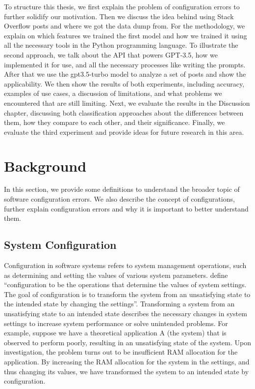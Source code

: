 \documentclass[english,bachelor]{swsLeipzig}
\begin{document}
To structure this thesis, we first explain the problem of configuration errors to further solidify our motivation. 
Then we discuss the idea behind using Stack Overflow posts and where we got the data dump from. For the methodology, 
we explain on which features we trained the first model and how we trained it using all the necessary tools in 
the Python programming language. To illustrate the second approach, we talk about the API that powers GPT-3.5, 
how we implemented it for use, and all the necessary processes like writing the prompts. After that we use 
the gpt3.5-turbo model to analyze a set of posts and show the applicability. We then show the results of both experiments, 
including accuracy, examples of use cases, a discussion of limitations, and what problems we encountered that 
are still limiting. Next, we evaluate the results in the Discussion chapter, discussing both classification 
approaches about the differences between them, how they compare to each other, and their significance. Finally, we 
evaluate the third experiment and provide ideas for future research in this area.

\chapter{Background}\label{background}
In this section, we provide some definitions to understand the broader topic of software configuration errors. 
We also describe the concept of configurations, further explain configuration errors and why it is important to 
better understand them.

\section{System Configuration}\label{system_configuration}
Configuration in software systems refers to system management operations, such as determining and setting the values 
of various system parameters. \citet{xuzhou:2015} define ``configuration to be the operations that determine 
the values of system settings. The goal of configuration is to transform the system from an unsatisfying state to the 
intended state by changing the settings''. Transforming a system from an unsatisfying state to an intended state 
describes the necessary changes in system settings to increase system performance or solve unintended problems. 
For example, suppose we have a theoretical application A (the system) that is observed to perform poorly, resulting 
in an unsatisfying state of the system. Upon investigation, the problem turns out to be insufficient RAM allocation 
for the application. By increasing the RAM allocation for the system in the settings, and thus changing its values, 
we have transformed the system to an intended state by configuration. 
\end{document}
